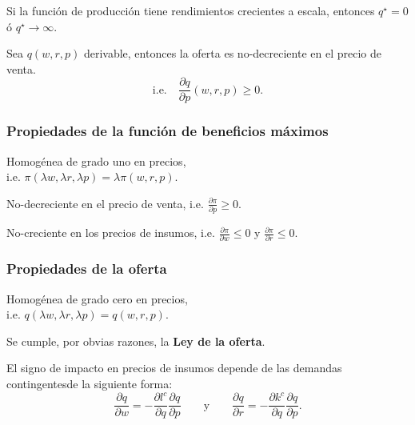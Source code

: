 \documentclass[8pt,a4paper]{extarticle}
\begin{document}
\begin{multicols}{3}
\begin{boxprop}
	Si la función de producción tiene rendimientos crecientes a escala, entonces $q^\star = 0$ ó $q^\star \to \infty$.
\end{boxprop}

\begin{boxtheo}
	Sea $q(w, r, p)$ derivable, entonces la oferta es no-decreciente en el precio de venta.
	\[
		\text{i.e.}\quad \frac{\partial q}{\partial p} (w, r, p) \ge 0
	.\] 
\end{boxtheo}

\subsubsection{Propiedades de la función de beneficios máximos}

\begin{eqlist}
\item Homogénea de grado uno en precios, \\ i.e. $\pi (\lambda w, \lambda r, \lambda p) = \lambda \pi(w, r, p)$.
\item No-decreciente en el precio de venta, i.e. $\displaystyle \frac{\partial \pi}{\partial p} \ge 0$.
\item No-creciente en los precios de insumos, i.e. $\displaystyle \frac{\partial \pi}{\partial w} \le 0$ y $\displaystyle \frac{\partial \pi}{\partial r} \le 0$.
\end{eqlist}

\subsubsection{Propiedades de la oferta}

\begin{eqlist}
\item Homogénea de grado cero en precios, \\ i.e. $q(\lambda w, \lambda r, \lambda p) = q(w, r, p)$.
\item Se cumple, por obvias razones, la \textbf{Ley de la oferta}.
\item El signo de impacto en precios de insumos depende de las demandas contingentesde la siguiente forma:
	\[
		\frac{\partial q}{\partial w} = - \frac{\partial l^c}{\partial q} \frac{\partial q}{\partial p} \qquad \text{y} \qquad \frac{\partial q}{\partial r} = - \frac{\partial k^c}{\partial q} \frac{\partial q}{\partial p}
	.\] 
\end{eqlist}


\end{multicols}
\end{document}
